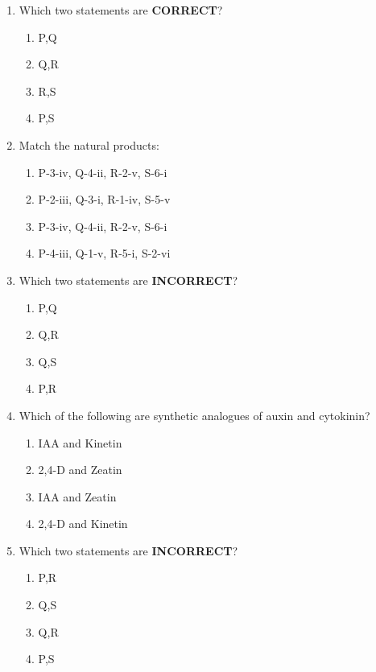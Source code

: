 \documentclass[journal]{IEEEtran}
\begin{document}
\begin{enumerate}
\item Which two statements are \textbf{CORRECT}?\hfill  \textit{}
\begin{enumerate}
    \item P,Q
    \item Q,R
    \item R,S
    \item P,S
\end{enumerate}

\item Match the natural products:\hfill  \textit{}
\begin{enumerate}
    \item P-3-iv, Q-4-ii, R-2-v, S-6-i
    \item P-2-iii, Q-3-i, R-1-iv, S-5-v
    \item P-3-iv, Q-4-ii, R-2-v, S-6-i
    \item P-4-iii, Q-1-v, R-5-i, S-2-vi
\end{enumerate}

\item Which two statements are \textbf{INCORRECT}?\hfill  \textit{}
\begin{enumerate}
    \item P,Q
    \item Q,R
    \item Q,S
    \item P,R
\end{enumerate}

\item Which of the following are synthetic analogues of auxin and cytokinin?\hfill  \textit{}
\begin{enumerate}
    \item IAA and Kinetin
    \item 2,4-D and Zeatin
    \item IAA and Zeatin
    \item 2,4-D and Kinetin
\end{enumerate}

\item Which two statements are \textbf{INCORRECT}?\hfill  \textit{}
\begin{enumerate}
    \item P,R
    \item Q,S
    \item Q,R
    \item P,S
\end{enumerate}


\end{enumerate}
\end{document}
